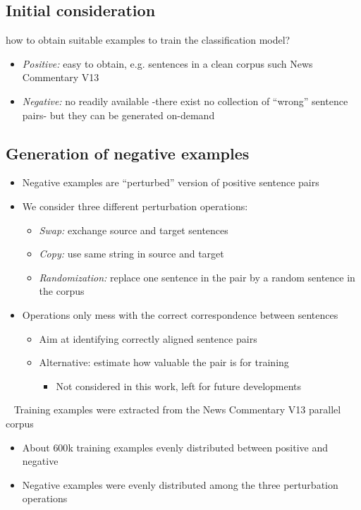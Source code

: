 \documentclass[a0]{sciposter}
\begin{document}
\begin{multicols*}{2}
\subsection*{Initial consideration} 
how to obtain suitable examples to train the classification model?
\begin{itemize}
  \item \textit{Positive:} easy to obtain, e.g. sentences in a clean corpus such News Commentary V13
  \item \textit{Negative:} no readily available -there exist no collection of ``wrong'' sentence pairs- but they can be generated on-demand
\end{itemize}

\subsection*{Generation of negative examples}
\begin{itemize}
  \item Negative examples are ``perturbed'' version of positive sentence pairs
  \item We consider three different perturbation operations:
  \begin{itemize}
  \item \textit{Swap:} exchange source and target sentences
  \item \textit{Copy:} use same string in source and target
  \item \textit{Randomization:} replace one sentence in the pair by a random sentence in the corpus
  \end{itemize}
  \item Operations only mess with the correct correspondence between sentences
  \begin{itemize}
    \item Aim at identifying correctly aligned sentence pairs
    \item Alternative: estimate how valuable the pair is for training
    \begin{itemize}
      \item Not considered in this work, left for future developments
    \end{itemize}
  \end{itemize}
\end{itemize}

~\newline
Training examples were extracted from the News Commentary V13 parallel corpus
\begin{itemize}
  \item About $600$k training examples evenly distributed between positive and negative
  \item Negative examples were evenly distributed among the three perturbation operations
\end{itemize}



\end{multicols*}
\end{document}
